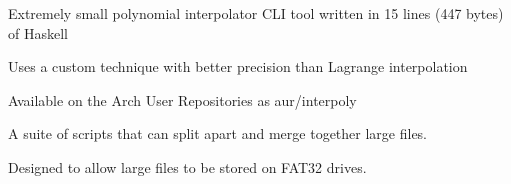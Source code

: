 \documentclass[letterpaper]{deedy-resume} %
\begin{document}
\begin{minipage}[t]{0.66\textwidth}

\vspace{1mm} %

\begin{tightitemize}
    \item Extremely small polynomial interpolator CLI tool written in 15 lines (447 
        bytes) of Haskell
    \item Uses a custom technique with better precision than Lagrange 
        interpolation
    \item Available on the Arch User Repositories as aur/interpoly
\end{tightitemize}
\sectionspace


\vspace{1mm} %

\begin{tightitemize}
    \item A suite of scripts that can split apart and merge together large files. 
    \item Designed to allow large files to be stored on FAT32 drives.
\end{tightitemize}
\sectionspace








\end{minipage}
\end{document}
